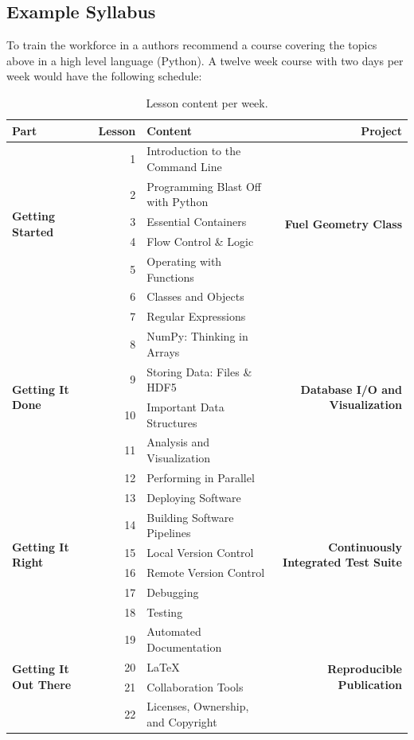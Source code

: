 \documentclass{anstrans}
\begin{document}
\subsection{Example Syllabus}

To train the workforce in a authors recommend a course covering the topics
above in a high level language (Python). A twelve week course with two days per
week would have the following schedule:

\begin{table}[t]
\centering
\begin{tabular}{|l|r|l|r|}
\hline
\textbf{Part} & \textbf{Lesson} & \textbf{Content} & \textbf{Project} \\
\hline
\multirow{6}{*}{\textbf{Getting Started}}
& 1 & Introduction to the Command Line
& \multirow{6}{*}{\textbf{Fuel Geometry Class}}\\
& 2 & Programming Blast Off with Python & \\
& 3 & Essential Containers & \\
& 4 & Flow Control \& Logic & \\
& 5 & Operating with Functions & \\
& 6 & Classes and Objects & \\
\hline
\multirow{6}{*}{\textbf{Getting It Done}}
& 7 & Regular Expressions
& \multirow{6}{*}{\textbf{Database I/O and Visualization}}\\
& 8 & NumPy: Thinking in Arrays & \\
& 9 & Storing Data: Files \& HDF5 & \\
& 10 & Important Data Structures & \\
& 11 & Analysis and Visualization & \\
& 12 & Performing in Parallel & \\
\hline
\multirow{6}{*}{\textbf{Getting It Right}}
& 13 & Deploying Software
& \multirow{6}{*}{\textbf{Continuously Integrated Test Suite}}\\
& 14 & Building Software Pipelines & \\
& 15 & Local Version Control & \\
& 16 & Remote Version Control & \\
& 17 & Debugging & \\
& 18 & Testing & \\
\hline
\multirow{4}{*}{\textbf{Getting It Out There}}
& 19 & Automated Documentation
& \multirow{4}{*}{\textbf{Reproducible Publication}}\\
& 20 & LaTeX & \\
& 21 & Collaboration Tools& \\
& 22 & Licenses, Ownership, and Copyright & \\
\hline
\end{tabular}
\caption{Lesson content per week.}
\label{tab:syllabus}
\end{table}
\end{document}
